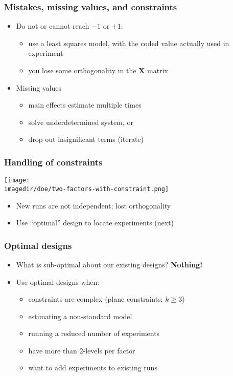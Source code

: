 \begin{frame}\frametitle{Mistakes, missing values, and constraints}
	\begin{itemize}
		\item	Do not or cannot reach $-1$ or $+1$:
		\begin{itemize}
			\item	use a least squares model, with the coded value actually used in experiment
			\item	you lose some orthogonality in the $\mathbf{X}$ matrix
		\end{itemize}
	\end{itemize}
	\begin{itemize}
		\item	Missing values
		\begin{itemize}
			\item	main effects estimate multiple times
			\item	solve underdetermined system, or
			\item	drop out insignificant terms (iterate)
		\end{itemize}
	\end{itemize}
\end{frame}

\begin{frame}\frametitle{Handling of constraints}
	\begin{center}
		\texttt{[image: \\imagedir/doe/two-factors-with-constraint.png]}
	\end{center}
	\begin{itemize}
		\item	New runs are not independent; lost orthogonality
		\item	Use ``optimal'' design to locate experiments (next)
	\end{itemize}
\end{frame}

\begin{frame}\frametitle{Optimal designs}
	\begin{itemize}
		\item	What is sub-optimal about our existing designs? \textbf{Nothing!}
		\item	Use optimal designs when:
		\begin{itemize}
			\item	constraints are complex (plane constraints; $k \geq 3$)
			\item	estimating a non-standard model
			\item	running a reduced number of experiments
			\item	have more than 2-levels per factor
			\item	want to add experiments to existing runs
		\end{itemize}
	\end{itemize}
\end{frame}

